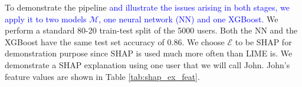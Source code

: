 \documentclass[mnsc,blindrev]{informs3}
\begin{document}
To demonstrate the pipeline \textcolor{blue}{and illustrate the issues arising in both stages, we apply it to two models $\mathcal{M}$, one neural network (NN) and one XGBoost.} %
We perform a standard 80-20 train-test split of the 5000 users. Both the NN and the XGBoost have the same test set accuracy of 0.86.
We choose $\mathcal{E}$ to be SHAP for demonstration purpose since SHAP is used much more often than LIME is. %
We demonstrate a SHAP explanation using one user that we will call John. %
John's feature values are shown in Table \ref{tab:shap_ex_feat}. %
\end{document}
